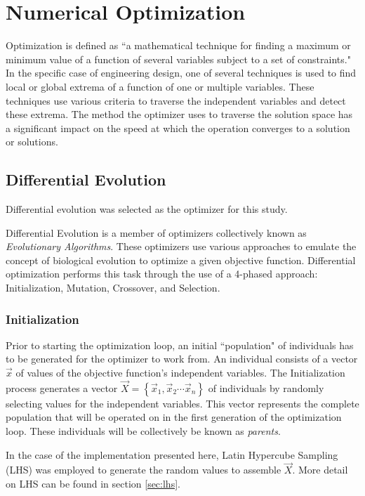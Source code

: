 \section{Numerical Optimization}
Optimization is defined as ``a mathematical technique for finding a maximum or minimum value of a function of several variables subject to a set of constraints."\cite{opt-def} In the specific case of engineering design, one of several techniques is used to find local or global extrema of a function of one or multiple variables. These techniques use various criteria to traverse the independent variables and detect these extrema. The method the optimizer uses to traverse the solution space has a significant impact on the speed at which the operation converges to a solution or solutions.\cite{basic-optim} 

\subsection{Differential Evolution}
Differential evolution was selected as the optimizer for this study. 

Differential Evolution is a member of optimizers collectively known as \emph{Evolutionary Algorithms}. These optimizers use various approaches to emulate the concept of biological evolution to optimize a given objective function. Differential optimization performs this task through the use of a 4-phased approach: Initialization, Mutation, Crossover, and Selection. \cite{diff-evol}

\subsubsection{Initialization}
Prior to starting the optimization loop, an initial ``population" of individuals has to be generated for the optimizer to work from. An individual consists of a vector $\vec{x}$ of values of the objective function's independent variables. The Initialization process generates a vector $\vec{X} = \left\{\vec{x}_1, \vec{x}_2 \cdots \vec{x}_n\right\}$ of individuals by randomly selecting values for the independent variables. This vector represents the complete population that will be operated on in the first generation of the optimization loop. These individuals will be collectively be known as \emph{parents}.\cite{diff-evol} 

In the case of the implementation presented here, Latin Hypercube Sampling (LHS) was employed to generate the random values to assemble $\vec{X}$. More detail on LHS can be found in section \ref{sec:lhs}. 

